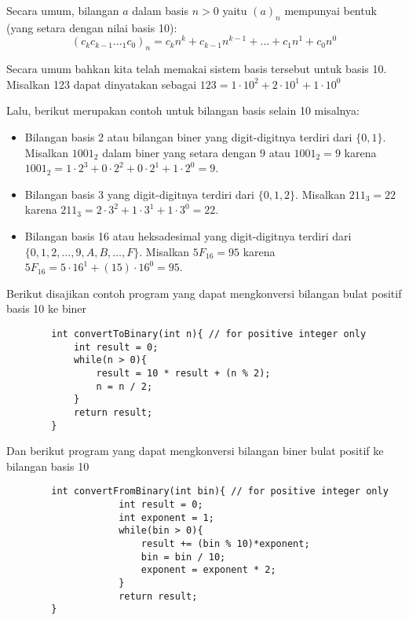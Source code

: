 \documentclass[11pt]{scrartcl}
\begin{document}
        Secara umum, bilangan $a$ dalam basis $n > 0$ yaitu $(a)_n$ mempunyai bentuk (yang setara dengan nilai basis 10):
        $$(c_kc_{k-1}\dotsc_1c_0)_n = c_{k}n^k + c_{k-1}n^{k-1}+\dots+c_1n^{1}+c_0n^{0}$$
        
        Secara umum bahkan kita telah memakai sistem basis tersebut untuk basis 10. Misalkan 123 dapat dinyatakan sebagai $123 = 1\cdot 10^2 + 2\cdot 10^1 + 1\cdot 10^0$
        
        Lalu, berikut merupakan contoh untuk bilangan basis selain 10 misalnya: 
        \begin{itemize}
            \item Bilangan basis 2 atau bilangan biner yang digit-digitnya terdiri dari $\{0,1\}$. Misalkan $1001_2$ dalam biner yang setara dengan $9$ atau $1001_2 = 9$ karena $1001_2 = 1\cdot 2^3+0\cdot 2^2+0\cdot 2^1+1\cdot 2^0 = 9$. 
            \item Bilangan basis 3 yang digit-digitnya terdiri dari $\{0,1,2\}$. Misalkan $211_3 = 22$ karena $211_3 = 2\cdot 3^2+ 1\cdot 3^1+ 1\cdot 3^0 = 22$.
            \item Bilangan basis 16 atau heksadesimal yang digit-digitnya terdiri dari $\{0,1,2,\dots,9,A,B,\dots,F\}$. Misalkan $5F_{16} = 95$ karena $5F_{16} = 5 \cdot 16^1 + (15)\cdot 16^0 = 95$.
        \end{itemize}
        Berikut disajikan contoh program yang dapat mengkonversi bilangan bulat positif basis 10 ke biner
        \begin{lstlisting}
        int convertToBinary(int n){ // for positive integer only
        	int result = 0;
        	while(n > 0){
        		result = 10 * result + (n % 2);
        		n = n / 2;
        	}
        	return result;
        }
        \end{lstlisting}
        Dan berikut program yang dapat mengkonversi bilangan biner bulat positif ke bilangan basis 10
        \begin{lstlisting}
        int convertFromBinary(int bin){ // for positive integer only
                	int result = 0;
                	int exponent = 1;
                	while(bin > 0){
                		result += (bin % 10)*exponent;
                		bin = bin / 10;
                		exponent = exponent * 2;
                	}
                	return result;
        }
        \end{lstlisting}
    
\end{document}
